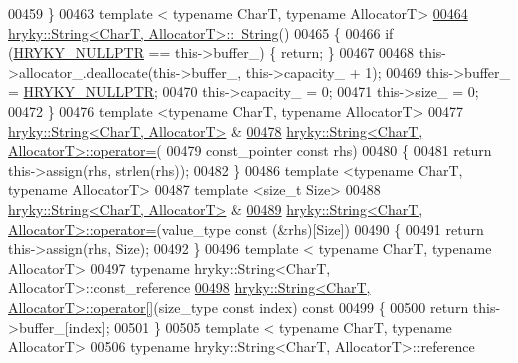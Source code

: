 \begin{DoxyCode}
00459 \}
00463 \textcolor{keyword}{template} < \textcolor{keyword}{typename} CharT, \textcolor{keyword}{typename} AllocatorT>
\hypertarget{string_8h_source_l00464}{}\hyperlink{classhryky_1_1_string_aad9c7884c7afd2b4543b3b90d1c7e0b2}{00464} \hyperlink{classhryky_1_1_string}{hryky::String<CharT, AllocatorT>::~String}()
00465 \{
00466     \textcolor{keywordflow}{if} (\hyperlink{common_8h_a4cd4ac09cfcdbd6b30ee69afc156e210}{HRYKY_NULLPTR} == this->buffer\_) \{ \textcolor{keywordflow}{return}; \}
00467 
00468     this->allocator\_.deallocate(this->buffer\_, this->capacity\_ + 1);
00469     this->buffer\_ = \hyperlink{common_8h_a4cd4ac09cfcdbd6b30ee69afc156e210}{HRYKY_NULLPTR};
00470     this->capacity\_ = 0;
00471     this->size\_ = 0;
00472 \}
00476 \textcolor{keyword}{template} <\textcolor{keyword}{typename} CharT, \textcolor{keyword}{typename} AllocatorT>
00477 \hyperlink{classhryky_1_1_string}{hryky::String<CharT, AllocatorT>} &
\hypertarget{string_8h_source_l00478}{}\hyperlink{classhryky_1_1_string_a65d2ec00521600df0d838c8b4b4ee61e}{00478} \hyperlink{classhryky_1_1_string}{hryky::String<CharT, AllocatorT>::operator=}(
00479     const\_pointer \textcolor{keyword}{const} rhs)
00480 \{
00481     \textcolor{keywordflow}{return} this->assign(rhs, strlen(rhs));
00482 \}
00486 \textcolor{keyword}{template} <\textcolor{keyword}{typename} CharT, \textcolor{keyword}{typename} AllocatorT>
00487 \textcolor{keyword}{template} <\textcolor{keywordtype}{size\_t} Size>
00488 \hyperlink{classhryky_1_1_string}{hryky::String<CharT, AllocatorT>} &
\hypertarget{string_8h_source_l00489}{}\hyperlink{classhryky_1_1_string_a29ae518048a170155f5addfd6c47b2ed}{00489} \hyperlink{classhryky_1_1_string}{hryky::String<CharT, AllocatorT>::operator=}(value\_type \textcolor{keyword}{const} (&rhs)[Size])
00490 \{
00491     \textcolor{keywordflow}{return} this->assign(rhs, Size);
00492 \}
00496 \textcolor{keyword}{template} < \textcolor{keyword}{typename} CharT, \textcolor{keyword}{typename} AllocatorT>
00497 \textcolor{keyword}{typename} hryky::String<CharT, AllocatorT>::const\_reference
\hypertarget{string_8h_source_l00498}{}\hyperlink{classhryky_1_1_string_ae4170a6bb4266d9185c88560014ca7fe}{00498} \hyperlink{classhryky_1_1_string}{hryky::String<CharT, AllocatorT>::operator[]}(size\_type \textcolor{keyword}{const} index)\textcolor{keyword}{ const}
00499 \textcolor{keyword}{}\{
00500     \textcolor{keywordflow}{return} this->buffer\_[index];
00501 \}
00505 \textcolor{keyword}{template} < \textcolor{keyword}{typename} CharT, \textcolor{keyword}{typename} AllocatorT>
00506 \textcolor{keyword}{typename} hryky::String<CharT, AllocatorT>::reference

\end{DoxyCode}
